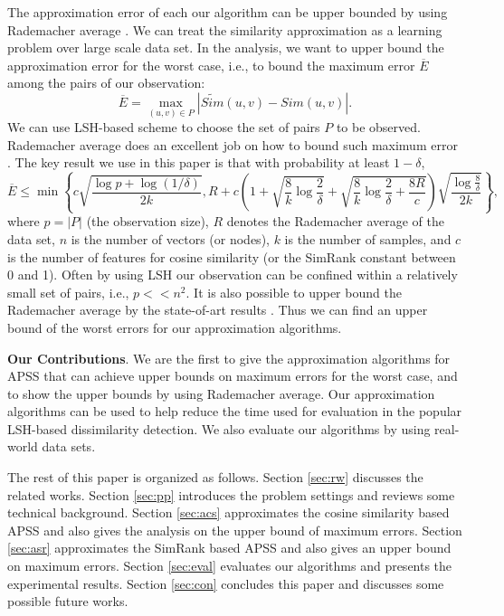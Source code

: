 \documentclass{article}
\begin{document}
The approximation error of each our algorithm can be upper bounded by using Rademacher average \cite{BM02,Mohri09,BBM05}. We can treat the similarity approximation as a learning problem over large scale data set. In the analysis, we want to upper bound the approximation error for the worst case, i.e., to bound the maximum error $\overline{E}$ among the pairs of our observation:
$$\overline{E} = \max_{(u,v)\in P} |\widetilde{Sim}(u,v) - Sim(u,v)|.$$
{\color{black}We can use LSH-based scheme to choose the set of pairs $P$ to be observed. }
Rademacher average does an excellent job on how to bound such maximum error \cite{RU15,RU16}. The key result we use in this paper is that with probability at least $1-\delta$,
$$\overline{E} \leq \min\left\{c\sqrt{\frac{\log p + \log(1/\delta)}{2k}}, R + c\left(1+\sqrt{\frac{8}{k}\log \frac{2}{\delta}} + \sqrt{\frac{8}{k}\log \frac{2}{\delta} + \frac{8R}{c}}\right)\sqrt{\frac{\log \frac{8}{\delta}}{2k}}\right\},$$
where $p=|P|$ (the observation size), $R$ denotes the Rademacher average of the data set, $n$ is the number of vectors (or nodes), $k$ is the number of samples, and $c$ is the number of features for cosine similarity (or the SimRank constant between 0 and 1). Often by using LSH our observation can be confined within a relatively small set of pairs, i.e., $p << n^2$. 
It is also possible to upper bound the Rademacher average by the state-of-art results \cite{AGO14,RU15,RU16}. Thus we can find an upper bound of the worst errors for our approximation algorithms.

{\color{black}
\textbf{Our Contributions}. We are the first to give the approximation algorithms for APSS that can achieve upper bounds on maximum errors for the worst case, and to show the upper bounds by using Rademacher average. Our approximation algorithms can be used to help reduce the time used for evaluation in the popular LSH-based dissimilarity detection. We also evaluate our algorithms by using real-world data sets.
}

The rest of this paper is organized as follows. Section \ref{sec:rw} discusses the related works. Section \ref{sec:pp} introduces the problem settings and reviews some technical background. Section \ref{sec:acs} approximates the cosine similarity based APSS and also gives the analysis on the upper bound of maximum errors. Section \ref{sec:asr} approximates the SimRank based APSS and also gives an upper bound on maximum errors. Section \ref{sec:eval} evaluates our algorithms and presents the experimental results. Section \ref{sec:con} concludes this paper and discusses some possible future works.
\end{document}
